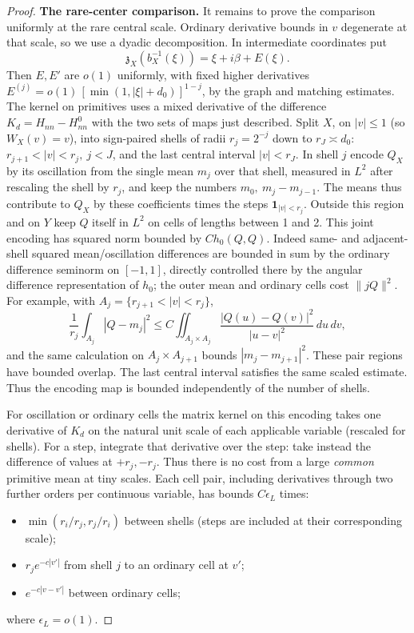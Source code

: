 \begin{proof}
\par\smallskip\noindent\textbf{The rare-center comparison.}
It remains to prove the comparison uniformly at the rare central scale. Ordinary derivative bounds in \(v\) degenerate at that scale, so we use a dyadic decomposition. In intermediate coordinates put
\[
 \mathfrak z_X(b_X^{-1}(\xi))=\xi+i\beta+E(\xi).
\]
Then \(E,E'\) are \(o(1)\) uniformly, with fixed higher derivatives \(E^{(j)}=o(1)\,[\min(1,|\xi|+d_0)]^{1-j}\), by the graph and matching estimates. The kernel on primitives uses a mixed derivative of the difference \(K_d=H_{nn}-H_{nn}^0\) with the two sets of maps just described. Split \(X\), on \(|v|\le1\) (so \(W_X(v)=v\)), into sign-paired shells of radii \(r_j=2^{-j}\) down to \(r_J\asymp d_0\): \(r_{j+1}<|v|<r_j,\ j<J\), and the last central interval \(|v|<r_J\). In shell \(j\) encode \(Q_X\) by its oscillation from the single mean \(m_j\) over that shell, measured in \(L^2\) after rescaling the shell by \(r_j\), and keep the numbers \(m_0,\ m_j-m_{j-1}\). The means thus contribute to \(Q_X\) by these coefficients times the steps \(\mathbf1_{|v|<r_j}\). Outside this region and on \(Y\) keep \(Q\) itself in \(L^2\) on cells of lengths between 1 and 2. This joint encoding has squared norm bounded by \(C h_0(Q,Q)\). Indeed same- and adjacent-shell squared mean/oscillation differences are bounded in sum by the ordinary difference seminorm on \([-1,1]\), directly controlled there by the angular difference representation of \(h_0\); the outer mean and ordinary cells cost \(\|jQ\|^2\).
For example, with \(A_j=\{r_{j+1}<|v|<r_j\}\),
\[
 \frac1{r_j}\int_{A_j}|Q-m_j|^2
 \le C\iint_{A_j\times A_j}
        \frac{|Q(u)-Q(v)|^2}{|u-v|^2}\,du\,dv,
\]
and the same calculation on \(A_j\times A_{j+1}\) bounds
\(|m_j-m_{j+1}|^2\). These pair regions have bounded overlap.
The last central interval satisfies the same scaled estimate. Thus the
encoding map is bounded independently of the number of shells.

For oscillation or ordinary cells the matrix kernel on this encoding takes one derivative of \(K_d\) on the natural unit scale of each applicable variable (rescaled for shells). For a step, integrate that derivative over the step: take instead the difference of values at \(+r_j,-r_j\). Thus there is no cost from a large \emph{common} primitive mean at tiny scales. Each cell pair, including derivatives through two further orders per continuous variable, has bounds \(C\epsilon_L\) times:
\begin{itemize}
\item \(\min(r_i/r_j,r_j/r_i)\) between shells (steps are included at their corresponding scale);
\item \(r_j e^{-c|v'|}\) from shell \(j\) to an ordinary cell at \(v'\);
\item \(e^{-c|v-v'|}\) between ordinary cells;
\end{itemize}
where \(\epsilon_L=o(1)\).


\end{proof}
